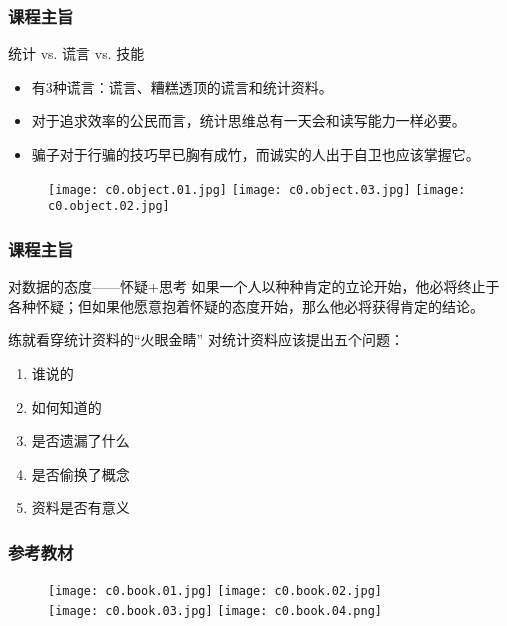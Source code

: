 \begin{frame}[fragile]
  \frametitle{课程主旨}
  \begin{block}{统计 vs. 谎言 vs. 技能}
    \begin{itemize}
      \item 有3种谎言：谎言、糟糕透顶的谎言和统计资料。
      \item 对于追求效率的公民而言，统计思维总有一天会和读写能力一样必要。
      \item 骗子对于行骗的技巧早已胸有成竹，而诚实的人出于自卫也应该掌握它。
    \end{itemize}
  \end{block}
  \pause
  \vspace{-0.5em}
  \begin{figure}
    \centering
    \texttt{[image: c0.object.01.jpg]}
    \texttt{[image: c0.object.03.jpg]}
    \texttt{[image: c0.object.02.jpg]}
  \end{figure}
\end{frame}

\begin{frame}
  \frametitle{课程主旨}
  \begin{block}{对数据的态度——怀疑+思考}
    如果一个人以种种肯定的立论开始，他必将终止于各种怀疑；但如果他愿意抱着怀疑的态度开始，那么他必将获得肯定的结论。
  \end{block}
  \pause
  \begin{block}{练就看穿统计资料的“火眼金睛”}
    对统计资料应该提出五个问题：
    \begin{enumerate}
      \item 谁说的
      \item 如何知道的
      \item 是否遗漏了什么
      \item 是否偷换了概念
      \item 资料是否有意义
    \end{enumerate}
  \end{block}
\end{frame}

\begin{frame}
  \frametitle{参考教材}
  \begin{figure}
    \centering
    \texttt{[image: c0.book.01.jpg]}\qquad
    \texttt{[image: c0.book.02.jpg]}\\
    \texttt{[image: c0.book.03.jpg]}\qquad
    \texttt{[image: c0.book.04.png]}
  \end{figure}
\end{frame}

